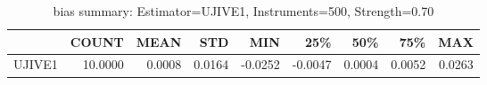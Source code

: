 \begin{table}[ht]
\centering
\caption{bias summary: Estimator=UJIVE1, Instruments=500, Strength=0.70}
\begin{tabular}{lrrrrrrrr}
\toprule
 & COUNT & MEAN & STD & MIN & 25\% & 50\% & 75\% & MAX \\
\midrule
UJIVE1 & 10.0000 & 0.0008 & 0.0164 & -0.0252 & -0.0047 & 0.0004 & 0.0052 & 0.0263 \\
\bottomrule
\end{tabular}
\end{table}
